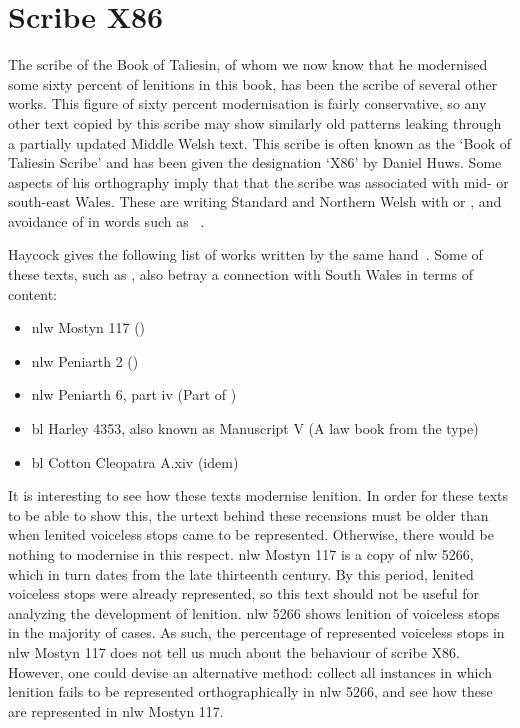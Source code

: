 \chapter{Scribe X86}
\label{cha:scribe-x86}
The scribe of the Book of Taliesin, of whom we now know that he modernised some sixty percent of lenitions in this book, has been the scribe of several other works. This figure of sixty percent modernisation is fairly conservative, so any other text copied by this scribe may show similarly old patterns leaking through a partially updated Middle Welsh text. This scribe is often known as the  `Book of Taliesin Scribe' and has been given the designation `X86' by Daniel Huws. Some aspects of his orthography imply that that the scribe was associated with mid- or south-east Wales. These are writing Standard and Northern Welsh  with  or , and avoidance of \mw{\ci} in words such as ~\autocite[2]{haycock_legendary_2015}.  

Haycock gives the following list of works written by the same hand~\autocite[2]{haycock_legendary_2015}. Some of these texts, such as , also betray a connection with South Wales in terms of content:

\begin{itemize}
    \item \gls{nlw} Mostyn 117 ()
    \item \gls{nlw} Peniarth 2 ()
    \item \gls{nlw} Peniarth 6, part iv (Part of )
    \item \gls{bl} Harley 4353, also known as Manuscript V (A law book from the  type)
    \item \gls{bl} Cotton Cleopatra A.xiv (idem)
\end{itemize}

It is interesting to see how these texts modernise lenition. In order for these texts to be able to show this, the urtext behind these recensions must be older than when lenited voiceless stops came to be represented. Otherwise, there would be nothing to modernise in this respect. \gls{nlw} Mostyn 117 is a copy of \gls{nlw} 5266, which in turn dates from the late thirteenth century. By this period, lenited voiceless stops were already represented, so this text should not be useful for analyzing the development of lenition. \gls{nlw} 5266 shows lenition of voiceless stops in the majority of cases. As such, the percentage of represented voiceless stops in \gls{nlw} Mostyn 117 does not tell us much about the behaviour of scribe X86. However, one could devise an alternative method: collect all instances in which lenition fails to be represented orthographically in \gls{nlw} 5266, and see how these are represented in \gls{nlw} Mostyn 117.

